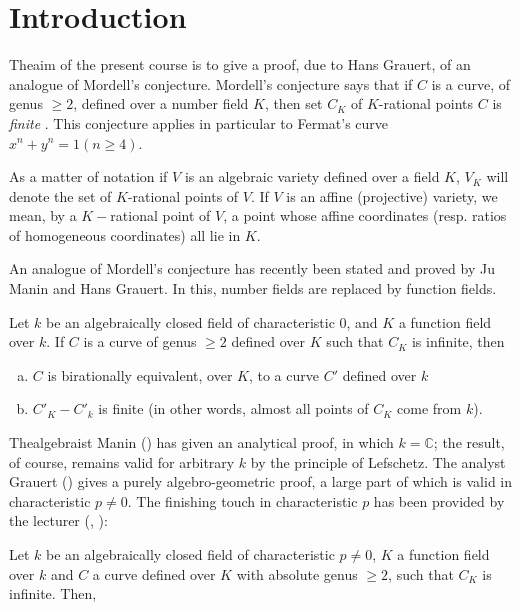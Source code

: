 \chapter*{Introduction}


The\pageoriginale aim of the present course is to give a proof, due to Hans Grauert,
of an analogue of Mordell's conjecture. Mordell's conjecture says that
if $C$ is a curve, of genus $\geq 2$, defined over a number field $K$,
then set $C_K$ of $K$-rational points $C$ is \textit{ finite }. This
conjecture applies in particular to Fermat's curve $x^n + y^n = 1 (n
\geq 4)$. 

As a matter of notation if $V$ is an algebraic variety defined over a
field $K$, $V_K$ will denote the set of $K$-rational points of $V$. If
$V$ is an affine (\resp projective) variety, we mean, by a
$K-$rational point of $V$, a point whose affine coordinates
(resp. ratios of homogeneous coordinates) all lie in $K$. 

An analogue of Mordell's conjecture has recently been stated and
proved by Ju Manin and Hans Grauert. In this, number fields are
replaced by function fields. 

\begin{theorem*} %
  Let $k$ be an algebraically closed field of characteristic $0$, and
  $K$ a function field over $k$. If $C$ is a curve of genus $\geq 2$
  defined over $K$ such that $C_K$ is infinite, then 
  \begin{enumerate}[a)]
  \item $C$ is birationally equivalent, over $K$, to a curve $C'$
    defined over $k$ 
  \item $C'_K - C'_k$ is finite (in other words, almost all points of
    $C_K$ come from $k$). 
  \end{enumerate}
\end{theorem*}

The\pageoriginale algebraist Manin (\cite{3}) has given an analytical proof, in which $k
=\mathbb{C}$; the result, of course, remains valid for arbitrary $k$ by
the principle of Lefschetz. The analyst Grauert (\cite{2}) gives a purely
algebro-geometric proof, a large part of which is valid in
characteristic $p \neq 0$. The finishing touch in characteristic $p$
has been provided by the lecturer (\cite{5}, \cite{6}): 

Let $k$ be an algebraically closed field of characteristic $p\neq 0$,
$K$ a function field over $k$ and $C$ a curve defined over $K$ with
absolute genus $\geq 2$, such that $C_K$ is infinite. Then, 

